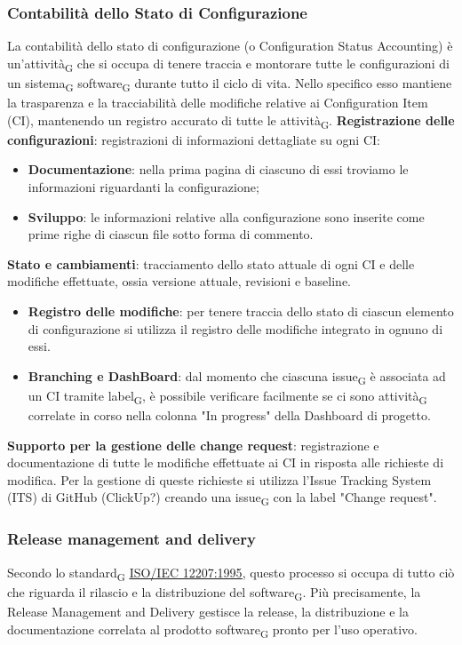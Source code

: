 \subsubsection{Contabilità dello Stato di Configurazione}
La contabilità dello stato di configurazione (o Configuration Status Accounting) è un'{attività\textsubscript{G}} 
che si occupa di tenere traccia e montorare tutte le configurazioni di un {sistema\textsubscript{G}} {software\textsubscript{G}}
durante tutto il ciclo di vita. Nello specifico esso mantiene la trasparenza e la tracciabilità delle modifiche relative ai Configuration Item (CI),
mantenendo un registro accurato di tutte le {attività\textsubscript{G}}.
\textbf{Registrazione delle configurazioni}: registrazioni di informazioni dettagliate su ogni CI:
\begin{itemize}
    \item \textbf{Documentazione}: nella prima pagina di ciascuno di essi troviamo le informazioni riguardanti la configurazione;
    \item \textbf{Sviluppo}: le informazioni relative alla configurazione sono inserite come prime
    righe di ciascun file sotto forma di commento.
\end{itemize}
\textbf{Stato e cambiamenti}: tracciamento dello stato attuale di ogni CI e delle modifiche effettuate, ossia versione attuale, revisioni e baseline.
\begin{itemize}
    \item \textbf{Registro delle modifiche}: per tenere traccia dello stato di ciascun elemento di configurazione si utilizza il registro
    delle modifiche integrato in ognuno di essi.
    \item \textbf{Branching e DashBoard}: dal momento che ciascuna {issue\textsubscript{G}} è associata ad un CI tramite
    {label\textsubscript{G}}, è possibile verificare facilmente se ci sono {attività\textsubscript{G}} correlate
    in corso nella colonna "In progress" della Dashboard di progetto.
\end{itemize}
\textbf{Supporto per la gestione delle change request}: registrazione e documentazione di tutte le modifiche effettuate ai CI in risposta alle
richieste di modifica. Per la gestione di queste richieste si utilizza l'Issue Tracking System (ITS) di GitHub (ClickUp?) creando una
{issue\textsubscript{G}} con la label "Change request".

\subsubsection{Release management and delivery}
Secondo lo {standard\textsubscript{G}} \href{https://www.math.unipd.it/~tullio/IS-1/2009/Approfondimenti/ISO_12207-1995.pdf}{\underline{ISO/IEC 12207:1995}},
questo processo si occupa di tutto ciò che riguarda il rilascio e la distribuzione del {software\textsubscript{G}}. Più precisamente,
la Release Management and Delivery gestisce la release, la distribuzione e la documentazione correlata al prodotto {software\textsubscript{G}}
pronto per l'uso operativo.

